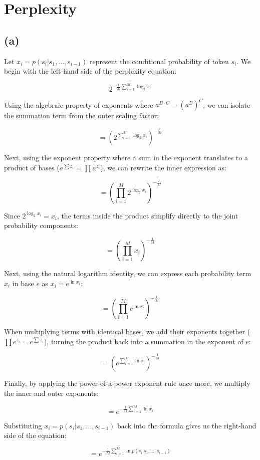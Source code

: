 \documentclass{article}
\begin{document}
\newpage
\section{Perplexity}
\subsection*{(a)}

Let $x_i = p(s_{i}|s_{1},...,s_{i-1})$ represent the conditional probability of token $s_i$. We begin with the left-hand side of the perplexity equation:

\[
2^{-\frac{1}{M}\sum_{i=1}^{M}\log_{2}x_i}
\]

Using the algebraic property of exponents where $a^{B \cdot C} = (a^B)^C$, we can isolate the summation term from the outer scaling factor:

\[
= \left( 2^{\sum_{i=1}^{M}\log_{2}x_i} \right)^{-\frac{1}{M}}
\]

Next, using the exponent property where a sum in the exponent translates to a product of bases ($a^{\sum z_i} = \prod a^{z_i}$), we can rewrite the inner expression as:

\[
= \left( \prod_{i=1}^{M} 2^{\log_2 x_i} \right)^{-\frac{1}{M}}
\]

Since $2^{\log_2 x_i} = x_i$, the terms inside the product simplify directly to the joint probability components:

\[
= \left( \prod_{i=1}^{M} x_i \right)^{-\frac{1}{M}}
\]

Next, using the natural logarithm identity, we can express each probability term $x_i$ in base $e$ as $x_i = e^{\ln x_i}$:

\[
= \left( \prod_{i=1}^{M} e^{\ln x_i} \right)^{-\frac{1}{M}}
\]

When multiplying terms with identical bases, we add their exponents together ($\prod e^{z_i} = e^{\sum z_i}$), turning the product back into a summation in the exponent of $e$:

\[
= \left( e^{\sum_{i=1}^{M} \ln x_i} \right)^{-\frac{1}{M}}
\]

Finally, by applying the power-of-a-power exponent rule once more, we multiply the inner and outer exponents:

\[
= e^{-\frac{1}{M}\sum_{i=1}^{M}\ln x_i}
\]

Substituting $x_i = p(s_{i}|s_{1},...,s_{i-1})$ back into the formula gives us the right-hand side of the equation:

\[
= e^{-\frac{1}{M}\sum_{i=1}^{M}\ln p(s_{i}|s_{1},...,s_{i-1})}
\]
\end{document}
